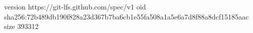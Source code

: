 version https://git-lfs.github.com/spec/v1
oid sha256:72b489db190f828a23d367b7ba6cb1e55fa508a1a5e6a7d8f88a8dcf15185aac
size 393312
